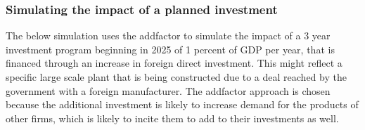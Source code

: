 \documentclass[letterpaper,10pt,english]{jupyterBook}
\begin{document}
\subsubsection{Simulating the impact of a planned investment}
\label{\detokenize{content/05_WBModels/ScenarioAnalysis:simulating-the-impact-of-a-planned-investment}}
\sphinxAtStartPar
The below simulation uses the add\sphinxhyphen{}factor to simulate the impact of a 3 year investment  program beginning in 2025 of 1 percent of GDP per year, that is financed through an increase in foreign direct investment. This might reflect a specific large scale plant that is being constructed due to a deal reached by the government with a foreign manufacturer.  The add\sphinxhyphen{}factor approach is chosen because the additional investment is likely to increase demand for the products of other firms, which is likely to incite them to add to their investments as well.
\end{document}
